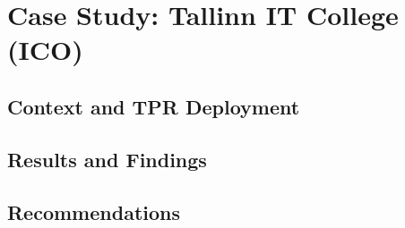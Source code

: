 
\newpage
\section{Case Study: Tallinn IT College (ICO)}

\subsection{Context and TPR Deployment}


\subsection{Results and Findings}


\subsection{Recommendations}

